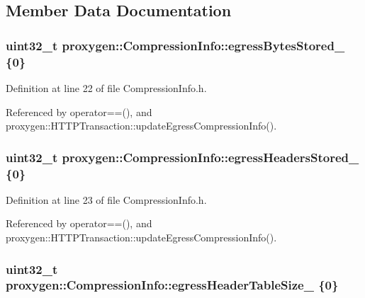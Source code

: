 \subsection{Member Data Documentation}
\subsubsection[{egress\+Bytes\+Stored\+\_\+}]{\setlength{\rightskip}{0pt plus 5cm}uint32\+\_\+t proxygen\+::\+Compression\+Info\+::egress\+Bytes\+Stored\+\_\+ \{0\}}\label{structproxygen_1_1CompressionInfo_ab78106ba4defb0d422206c5430a8b7e6}


Definition at line 22 of file Compression\+Info.\+h.



Referenced by operator==(), and proxygen\+::\+H\+T\+T\+P\+Transaction\+::update\+Egress\+Compression\+Info().

\subsubsection[{egress\+Headers\+Stored\+\_\+}]{\setlength{\rightskip}{0pt plus 5cm}uint32\+\_\+t proxygen\+::\+Compression\+Info\+::egress\+Headers\+Stored\+\_\+ \{0\}}\label{structproxygen_1_1CompressionInfo_a8505af2a2798b0e40c86c05600f0a67b}


Definition at line 23 of file Compression\+Info.\+h.



Referenced by operator==(), and proxygen\+::\+H\+T\+T\+P\+Transaction\+::update\+Egress\+Compression\+Info().

\subsubsection[{egress\+Header\+Table\+Size\+\_\+}]{\setlength{\rightskip}{0pt plus 5cm}uint32\+\_\+t proxygen\+::\+Compression\+Info\+::egress\+Header\+Table\+Size\+\_\+ \{0\}}\label{structproxygen_1_1CompressionInfo_a22477e99d07b08d4f8fdb72b65479de2}


